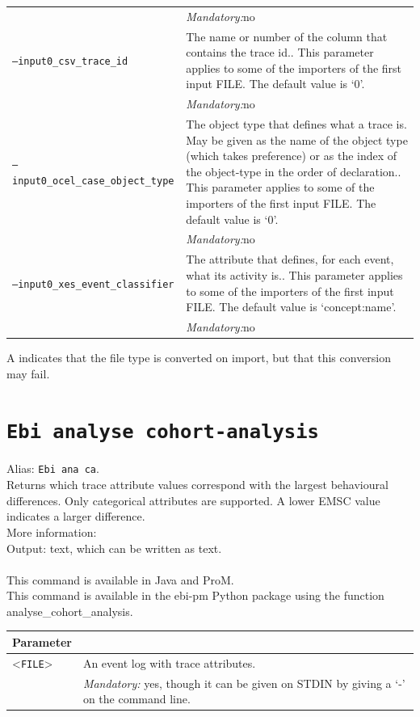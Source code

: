 {\begin{tabularx}{\linewidth}{lX}
&\textit{Mandatory:}\quad no\\
\texttt{--input0\_csv\_trace\_id} & The name or number of the column that contains the trace id.. This parameter applies to some of the importers of the first input FILE. The default value is `0'.\\
&\textit{Mandatory:}\quad no\\
\texttt{--input0\_ocel\_case\_object\_type} & The object type that defines what a trace is. May be given as the name of the object type (which takes preference) or as the index of the object-type in the order of declaration.. This parameter applies to some of the importers of the first input FILE. The default value is `0'.\\
&\textit{Mandatory:}\quad no\\
\texttt{--input0\_xes\_event\_classifier} & The attribute that defines, for each event, what its activity is.. This parameter applies to some of the importers of the first input FILE. The default value is `concept:name'.\\
&\textit{Mandatory:}\quad no\\
\bottomrule
\end{tabularx}
A \textdagger{} indicates that the file type is converted on import, but that this conversion may fail.
\clearpage\section{\texttt{Ebi analyse cohort-analysis}}
\label{command:Ebi analyse cohort-analysis}
Alias: \texttt{Ebi ana ca}.\\
Returns which trace attribute values correspond with the largest behavioural differences. Only categorical attributes are supported. A lower EMSC value indicates a larger difference.\\
More information: \cite{DBLP:conf/er/LeemansS0KSW20}~\\
\noindent Output: text, which can be written as  text.\\
\\This command is available in Java and ProM.
\\This command is available in the ebi-pm Python package using the function analyse\_cohort\_analysis.
\begin{tabularx}{\linewidth}{lX}
\toprule
Parameter \\\midrule
<\texttt{FILE}>&An event log with trace attributes.\\
&\textit{Mandatory:} \quad yes, though it can be given on STDIN by giving a `-' on the command line.\\

\end{tabularx}}
